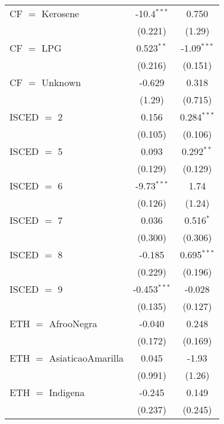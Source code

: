 \begin{table}[htbp!]
\begin{adjustbox}{width = 1\textwidth, max height = 0.95\textheight, center}
\begin{threeparttable}[b]
\begin{tabular}{lcc}
            CF $=$ Kerosene           & -10.4$^{***}$  & 0.750\\   
                                      & (0.221)        & (1.29)\\   
            CF $=$ LPG                & 0.523$^{**}$   & -1.09$^{***}$\\   
                                      & (0.216)        & (0.151)\\   
            CF $=$ Unknown            & -0.629         & 0.318\\   
                                      & (1.29)         & (0.715)\\   
            ISCED $=$ 2               & 0.156          & 0.284$^{***}$\\   
                                      & (0.105)        & (0.106)\\   
            ISCED $=$ 5               & 0.093          & 0.292$^{**}$\\   
                                      & (0.129)        & (0.129)\\   
            ISCED $=$ 6               & -9.73$^{***}$  & 1.74\\   
                                      & (0.126)        & (1.24)\\   
            ISCED $=$ 7               & 0.036          & 0.516$^{*}$\\   
                                      & (0.300)        & (0.306)\\   
            ISCED $=$ 8               & -0.185         & 0.695$^{***}$\\   
                                      & (0.229)        & (0.196)\\   
            ISCED $=$ 9               & -0.453$^{***}$ & -0.028\\   
                                      & (0.135)        & (0.127)\\   
            ETH $=$ AfrooNegra        & -0.040         & 0.248\\   
                                      & (0.172)        & (0.169)\\   
            ETH $=$ AsiaticaoAmarilla & 0.045          & -1.93\\   
                                      & (0.991)        & (1.26)\\   
            ETH $=$ Indigena          & -0.245         & 0.149\\   
                                      & (0.237)        & (0.245)\\   

\end{tabular}
\end{threeparttable}
\end{adjustbox}
\end{table}
